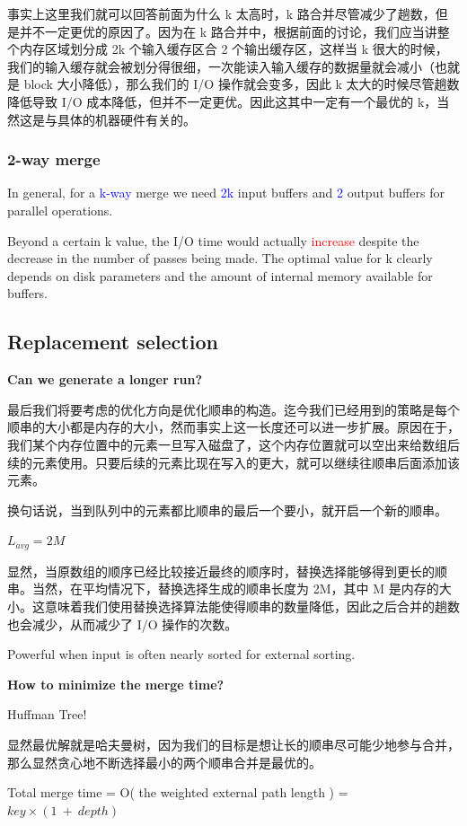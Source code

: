 \documentclass{article}
\begin{document}
事实上这里我们就可以回答前面为什么 k 太高时，k 路合并尽管减少了趟数，但是并不一定更优的原因了。因为在 k 路合并中，根据前面的讨论，我们应当讲整个内存区域划分成 2k 个输入缓存区合 2 个输出缓存区，这样当 k 很大的时候，我们的输入缓存就会被划分得很细，一次能读入输入缓存的数据量就会减小（也就是 block 大小降低），那么我们的 I/O 操作就会变多，因此 k 太大的时候尽管趟数降低导致 I/O 成本降低，但并不一定更优。因此这其中一定有一个最优的 k，当然这是与具体的机器硬件有关的。

\subsubsection{2-way merge}

In general, for a \textcolor{blue}{k-way} merge we need \textcolor{blue}{2k} input buffers and \textcolor{blue}{2} output buffers for parallel operations.

Beyond a certain k value, the I/O time would actually \textcolor{red}{increase} despite the decrease in the number of passes being made.  The optimal value for k clearly depends on disk parameters and the amount of internal memory available for buffers.

\subsection{Replacement selection}

\textbf{Can we generate a longer run?}

最后我们将要考虑的优化方向是优化顺串的构造。迄今我们已经用到的策略是每个顺串的大小都是内存的大小，然而事实上这一长度还可以进一步扩展。原因在于，我们某个内存位置中的元素一旦写入磁盘了，这个内存位置就可以空出来给数组后续的元素使用。只要后续的元素比现在写入的更大，就可以继续往顺串后面添加该元素。

换句话说，当到队列中的元素都比顺串的最后一个要小，就开启一个新的顺串。

$L_{avg} = 2M$

显然，当原数组的顺序已经比较接近最终的顺序时，替换选择能够得到更长的顺串。当然，在平均情况下，替换选择生成的顺串长度为 2M，其中 M 是内存的大小。这意味着我们使用替换选择算法能使得顺串的数量降低，因此之后合并的趟数也会减少，从而减少了 I/O 操作的次数。

Powerful when input is often nearly sorted for external sorting.

\par\hspace*{\fill}\par

\textbf{How to minimize the merge time?}

Huffman Tree!

显然最优解就是哈夫曼树，因为我们的目标是想让长的顺串尽可能少地参与合并，那么显然贪心地不断选择最小的两个顺串合并是最优的。

Total merge time = O( the weighted external path length ) = $key \times (1\ +\ depth)$
\end{document}
